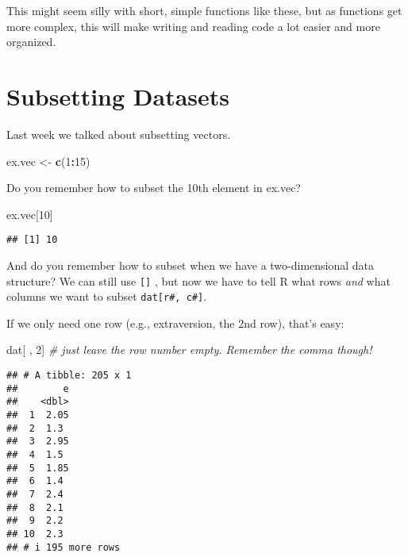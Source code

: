 \documentclass[
]{article}
\newenvironment{Shaded}{\begin{snugshade}}{\end{snugshade}}
\newcommand{\CommentTok}[1]{\textcolor[rgb]{0.56,0.35,0.01}{\textit{#1}}}
\newcommand{\DecValTok}[1]{\textcolor[rgb]{0.00,0.00,0.81}{#1}}
\newcommand{\FunctionTok}[1]{\textcolor[rgb]{0.13,0.29,0.53}{\textbf{#1}}}
\newcommand{\NormalTok}[1]{#1}
\newcommand{\OtherTok}[1]{\textcolor[rgb]{0.56,0.35,0.01}{#1}}
\newcommand{\SpecialCharTok}[1]{\textcolor[rgb]{0.81,0.36,0.00}{\textbf{#1}}}
\begin{document}
This might seem silly with short, simple functions like these, but as
functions get more complex, this will make writing and reading code a
lot easier and more organized.

\hypertarget{subsetting-datasets}{%
\section{Subsetting Datasets}\label{subsetting-datasets}}

Last week we talked about subsetting vectors.

\begin{Shaded}
\begin{Highlighting}[]
\NormalTok{ex.vec }\OtherTok{\textless{}{-}} \FunctionTok{c}\NormalTok{(}\DecValTok{1}\SpecialCharTok{:}\DecValTok{15}\NormalTok{)}
\end{Highlighting}
\end{Shaded}

Do you remember how to subset the 10th element in ex.vec?

\begin{Shaded}
\begin{Highlighting}[]
\NormalTok{ex.vec[}\DecValTok{10}\NormalTok{]}
\end{Highlighting}
\end{Shaded}

\begin{verbatim}
## [1] 10
\end{verbatim}

And do you remember how to subset when we have a two-dimensional data
structure? We can still use \texttt{{[}{]}} , but now we have to tell R
what rows \emph{and} what columns we want to subset
\texttt{dat{[}r\#,\ c\#{]}}.

If we only need one row (e.g., extraversion, the 2nd row), that's easy:

\begin{Shaded}
\begin{Highlighting}[]
\NormalTok{dat[ , }\DecValTok{2}\NormalTok{] }\CommentTok{\# just leave the row number empty. Remember the comma though!}
\end{Highlighting}
\end{Shaded}

\begin{verbatim}
## # A tibble: 205 x 1
##        e
##    <dbl>
##  1  2.05
##  2  1.3 
##  3  2.95
##  4  1.5 
##  5  1.85
##  6  1.4 
##  7  2.4 
##  8  2.1 
##  9  2.2 
## 10  2.3 
## # i 195 more rows
\end{verbatim}
\end{document}
